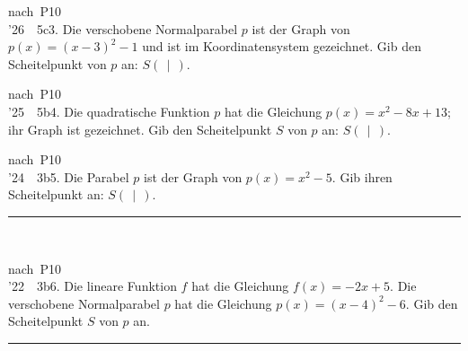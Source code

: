\documentclass[11pt]{article}
\newcommand{\gzwei}[2]{\par\smallskip\noindent\sbox{\gbox}{#1}%
  \setlength{\gLinks}{\dimexpr\wd\gbox+6mm\relax}%
  \ifdim\gLinks>0.62\linewidth
    \usebox{\gbox}\par\smallskip\noindent\begin{minipage}{\linewidth}#2\end{minipage}%
  \else
    \begin{minipage}[t]{\gLinks}\vspace{0pt}\usebox{\gbox}\end{minipage}%
    \begin{minipage}[t]{\dimexpr\linewidth-\gLinks\relax}\vspace{0pt}\raggedright #2\end{minipage}%
  \fi\par}
\newcommand{\gbegriff}[1]{\par\nobreak\noindent\hspace*{\mbpfnr}\parbox[t]{\dimexpr\linewidth-\mbpfnr\relax}{\raggedright\small\color{mbgrau}#1}\par\nobreak\addvspace{3pt}}
\def\gkopfnach{}
\newcommand{\gkopfvor}[1]{\gdef\gkopfnach{#1}}
\newcommand{\karo}[1]{\par\smallskip\noindent\begin{tikzpicture}
  \clip (0,0) rectangle ({\linewidth-1mm},{#1*10mm});
  \draw[black!16,line width=0.3pt,step=5mm] (0,0) grid ({\linewidth},{#1*10mm});
  \end{tikzpicture}\par}
\newcommand{\linie}[1]{\,{\color{black!45}\rule[-1pt]{#1}{0.4pt}}\,}
\newcommand{\pkt}{\textperiodcentered{}}
\begin{document}
\gkopfvor{\gbstvor{B}\pfstufekopf{Scheitelpunkt angeben}{\gpunkte[26 25 24 23 22]{\textcolor{black!80}{$\bullet$}\,\textcolor{black!80}{$\bullet$}\,\textcolor{black!80}{$\bullet$}\,\textcolor{black!80}{$\bullet$}\,\textcolor{black!80}{$\bullet$}}}\special{pdf:dest (stufe-scheitelpunkt-angeben) [@thispage /XYZ @xpos @ypos null]}\gbegriff{\textbf{Scheitelpunkt:} der tiefste Punkt der Parabel, bei einer nach unten geöffneten der höchste.}}
\begin{pfaufg}{nach~P10\\’26~\pkt{}~5c}{3.}{}
Die verschobene Normalparabel $p$ ist der Graph von $p(x) = (x-3)^2 - 1$ und ist im Koordinatensystem gezeichnet. Gib den Scheitelpunkt von $p$ an: $S(\ \ |\ \ )$.
\gzwei{\begin{ksys}[xmin=-1,xmax=6,ymin=-2,ymax=6,karo=0.5]\parabel{1}{3}{-1}{p}\end{ksys}}{\karo{3}}
\end{pfaufg}
\begin{pfaufg}{nach~P10\\’25~\pkt{}~5b}{4.}{}
Die quadratische Funktion $p$ hat die Gleichung $p(x) = x^2 - 8x + 13$; ihr Graph ist gezeichnet. Gib den Scheitelpunkt $S$ von $p$ an: $S(\ \ |\ \ )$.
\gzwei{\begin{ksys}[xmin=-1,xmax=8,ymin=-4,ymax=6,karo=0.5]\parabel{1}{4}{-3}{p}\end{ksys}}{\vspace{2mm}\linie{30mm}}
\end{pfaufg}
\begin{pfaufg}{nach~P10\\’24~\pkt{}~3b}{5.}{}
Die Parabel $p$ ist der Graph von $p(x) = x^2 - 5$. Gib ihren Scheitelpunkt an: $S(\ \ |\ \ )$.
\hfill\linie{30mm}
\end{pfaufg}
\begin{pfaufg}{nach~P10\\’22~\pkt{}~3b}{6.}{}
Die lineare Funktion $f$ hat die Gleichung $f(x) = -2x + 5$. Die verschobene Normalparabel $p$ hat die Gleichung $p(x) = (x-4)^2 - 6$. Gib den Scheitelpunkt $S$ von $p$ an.
\hfill\linie{30mm}
\end{pfaufg}
\end{document}
